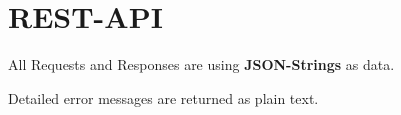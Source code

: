 \section{REST-API}

\newcommand{\returnline}[1]{\textbf{Returns:} #1}
\newcommand{\return}[2]{\textbf{Returns:} #1
  \begin{addmargin}{0.05\textwidth}
  #2
  \end{addmargin}
}
\newcommand{\param}[2]{\textbf{Request-Body:} #1
  \begin{addmargin}{0.05\textwidth}
  #2
  \end{addmargin}
}

All Requests and Responses are using \textbf{JSON-Strings} as data.

Detailed error messages are returned as plain text.

